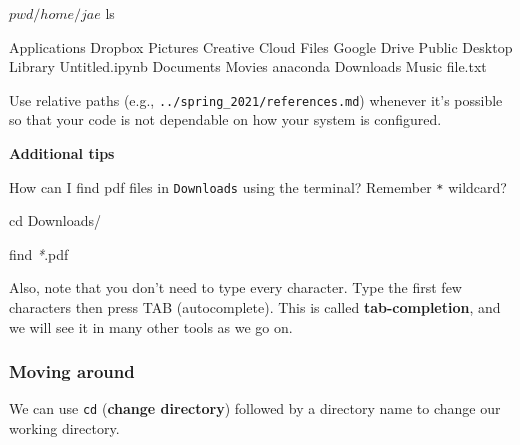 \documentclass[
]{book}
\newenvironment{Shaded}{\begin{snugshade}}{\end{snugshade}}
\newcommand{\BuiltInTok}[1]{#1}
\newcommand{\ExtensionTok}[1]{#1}
\newcommand{\FunctionTok}[1]{\textcolor[rgb]{0.00,0.00,0.00}{#1}}
\newcommand{\NormalTok}[1]{#1}
\newcommand{\PreprocessorTok}[1]{\textcolor[rgb]{0.56,0.35,0.01}{\textit{#1}}}
\begin{document}
\begin{Shaded}
\begin{Highlighting}[]
\ExtensionTok{$}\NormalTok{ pwd}

\ExtensionTok{/home/jae}

\ExtensionTok{$}\NormalTok{ ls}

\ExtensionTok{Applications}\NormalTok{        Dropbox         Pictures}
\ExtensionTok{Creative}\NormalTok{ Cloud Files    Google Drive        Public}
\ExtensionTok{Desktop}\NormalTok{         Library         Untitled.ipynb}
\ExtensionTok{Documents}\NormalTok{       Movies          anaconda}
\ExtensionTok{Downloads}\NormalTok{       Music           file.txt}
\end{Highlighting}
\end{Shaded}

Use relative paths (e.g., \texttt{../spring\_2021/references.md}) whenever it's possible so that your code is not dependable on how your system is configured.

\textbf{Additional tips}

How can I find pdf files in \texttt{Downloads} using the terminal? Remember \texttt{*} wildcard?

\begin{Shaded}
\begin{Highlighting}[]
\BuiltInTok{cd}\NormalTok{ Downloads/ }

\FunctionTok{find} \PreprocessorTok{*}\NormalTok{.pdf}
\end{Highlighting}
\end{Shaded}

Also, note that you don't need to type every character. Type the first few characters then press TAB (autocomplete). This is called \textbf{tab-completion}, and we will see it in many other tools as we go on.

\hypertarget{moving-around}{%
\subsubsection{Moving around}\label{moving-around}}

We can use \texttt{cd} (\textbf{change directory}) followed by a directory name to change our working directory.

\begin{Shaded}
\end{Shaded}
\end{document}
